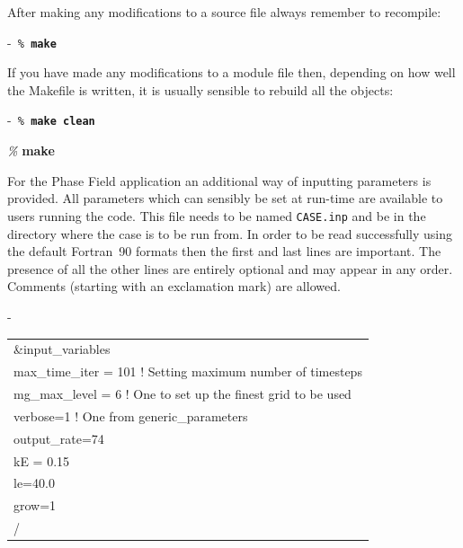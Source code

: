 \documentclass[paper=a4, fontsize=11pt,twoside,bibtotoc]{scrartcl}		%
\newenvironment{codebox}{\begin{center}\begin{MakeFramed}{\hsize0.99\linewidth\advance\hsize-\width\FrameRestore}\tt}{\end{MakeFramed}\end{center}}
\newcommand{\prompt}[1]{\textsl{\%} \textbf{#1}}
\begin{document}
After making any modifications to a source file always remember to recompile:
\begin{codebox}
        \prompt{make}
\end{codebox}
If you have made any modifications to a module file then, depending on how well the Makefile is written, it is usually sensible to rebuild all the objects:
\begin{codebox}
        \prompt{make clean}

        \prompt{make}
\end{codebox}

For the Phase Field application an additional way of inputting parameters is provided.  All parameters which can sensibly be set at run-time are available to 
users running the code.  This file needs to be named \texttt{CASE.inp} and be in the directory where the case is to be run from.  In order to be read 
successfully using the default Fortran~90 formats then the first and last lines are important.  The presence of all the other lines are entirely optional 
and may appear in any order.  Comments (starting with an exclamation mark) are allowed.
\begin{codebox}
	\begin{tabular}{l}
	\&input\_variables \\
	max\_time\_iter = 101  ! Setting maximum number of timesteps\\
	mg\_max\_level = 6     ! One to set up the finest grid to be used\\
	verbose=1            ! One from generic\_parameters\\
	output\_rate=74\\
	kE = 0.15\\
	le=40.0\\
	grow=1\\
	/
	\end{tabular}
\end{codebox}
\end{document}
